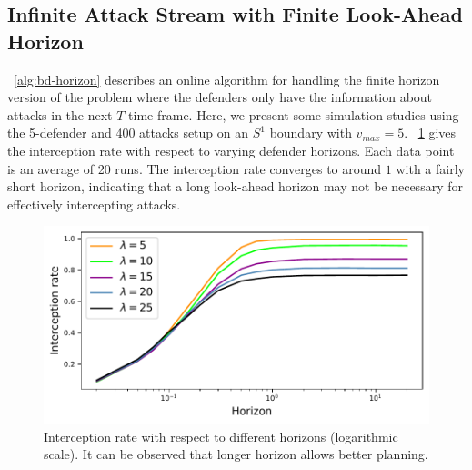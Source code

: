 \subsection{Infinite Attack Stream with Finite Look-Ahead Horizon}
~\ref{alg:bd-horizon} describes an online \ours algorithm for handling the finite horizon version of the problem where the defenders only have the information about attacks in the next $T$ time frame.
Here, we present some simulation studies using the 5-defender and 400 attacks setup on an $S^1$ boundary with $v_{max} = 5$. 
~\ref{fig:bd-horizon} gives the interception rate with respect to varying defender horizons. Each data point is an average of 20 runs. 
The interception rate converges to around $1$ with a fairly short horizon, 
indicating that a long look-ahead horizon may not be necessary for effectively intercepting attacks.
\begin{figure}
    \vspace{-1mm}
    \centering
    \includegraphics[width=0.6\linewidth]{chapters/bd/fig/horizon.pdf}
    \vspace{-2mm}
    \caption{Interception rate with respect to different horizons (logarithmic scale). It can be observed that longer horizon allows better planning.}
    \label{fig:bd-horizon}
    \vspace{-3mm}
\end{figure}

